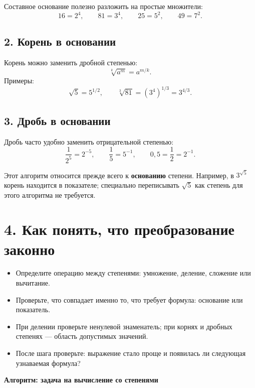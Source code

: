 \documentclass[a4paper,12pt]{article}
\newcommand{\note}[1]{\par\smallskip\noindent{\color{warn}\textbf{Проверка:}} #1\par\smallskip}
\begin{document}
Составное основание полезно разложить на простые множители:
\[
16=2^4,\qquad 81=3^4,\qquad 25=5^2,\qquad 49=7^2.
\]

\subsection*{2. Корень в основании}
Корень можно заменить дробной степенью:
\[
\sqrt[k]{a^m}=a^{m/k}.
\]
Примеры:
\[
\sqrt{5}=5^{1/2},\qquad \sqrt[3]{81}=\left(3^4\right)^{1/3}=3^{4/3}.
\]

\subsection*{3. Дробь в основании}
Дробь часто удобно заменить отрицательной степенью:
\[
\frac1{2^5}=2^{-5},\qquad \frac15=5^{-1},\qquad 0{,}5=\frac12=2^{-1}.
\]

\note{Этот алгоритм относится прежде всего к \textbf{основанию} степени. Например, в $3^{\sqrt5}$ корень находится в показателе; специально переписывать $\sqrt5$ как степень для этого алгоритма не требуется.}

\section*{4. Как понять, что преобразование законно}
{\small
\begin{itemize}
  \item Определите операцию между степенями: умножение, деление, сложение или вычитание.
  \item Проверьте, что совпадает именно то, что требует формула: основание или показатель.
  \item При делении проверьте ненулевой знаменатель; при корнях и дробных степенях — область допустимых значений.
  \item После шага проверьте: выражение стало проще и появилась ли следующая узнаваемая формула?
\end{itemize}
}

\clearpage

\thispagestyle{plain}
\begin{center}
{\Large\bfseries\color{darkaccent}Алгоритм: задача на вычисление со степенями}
\end{center}
\vspace{8mm}
\end{document}
